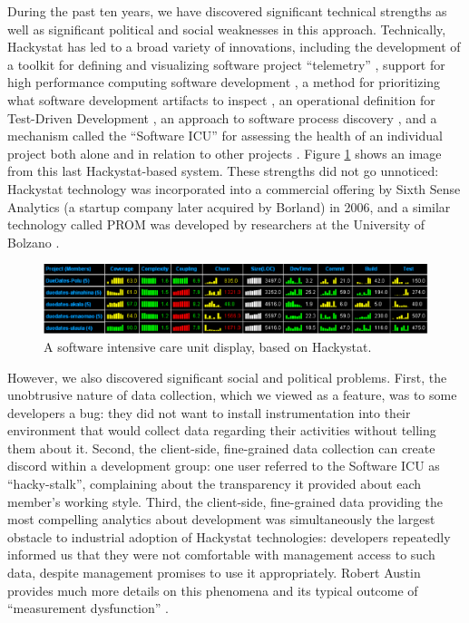 \documentclass[]{article}
\begin{document}
During the past ten years, we have discovered significant technical strengths as well as
significant political and social weaknesses in this approach.  Technically, Hackystat has
led to a broad variety of innovations, including the development of a toolkit for defining
and visualizing software project ``telemetry'' \cite{csdl2-04-11}, support for high
performance computing software development \cite{csdl2-04-22}, a method for prioritizing
what software development artifacts to inspect \cite{csdl2-05-01}, an operational
definition for Test-Driven Development \cite{csdl2-09-01}, an approach to software process
discovery \cite{csdl2-10-09}, and a mechanism called the ``Software ICU'' for assessing
the health of an individual project both alone and in relation to other projects
\cite{csdl2-09-02}.  Figure \ref{fig:icu} shows an image from this last Hackystat-based
system.  These strengths did not go unnoticed: Hackystat technology was incorporated into
a commercial offering by Sixth Sense Analytics (a startup company later acquired by
Borland) in 2006, and a similar technology called PROM was developed by researchers at the
University of Bolzano \cite{Coman2009}.


\begin{figure}[!tb]
\centering
\includegraphics[width=1.0\columnwidth]{portfolio-2008.eps}
\caption{A software intensive care unit display, based on Hackystat.}
\label{fig:icu}
\end{figure}


However, we also discovered significant social and political problems.  First, the
unobtrusive nature of data collection, which we viewed as a feature, was to some
developers a bug: they did not want to install instrumentation into their environment that
would collect data regarding their activities without telling them about it.  Second, the
client-side, fine-grained data collection can create discord within a development group:
one user referred to the Software ICU as ``hacky-stalk'', complaining about the
transparency it provided about each member's working style.  Third, the client-side,
fine-grained data providing the most compelling analytics about development was
simultaneously the largest obstacle to industrial adoption of Hackystat technologies:
developers repeatedly informed us that they were not comfortable with management access to
such data, despite management promises to use it appropriately. Robert Austin provides
much more details on this phenomena and its typical outcome of ``measurement dysfunction''
\cite{Austin96}.  
\end{document}
